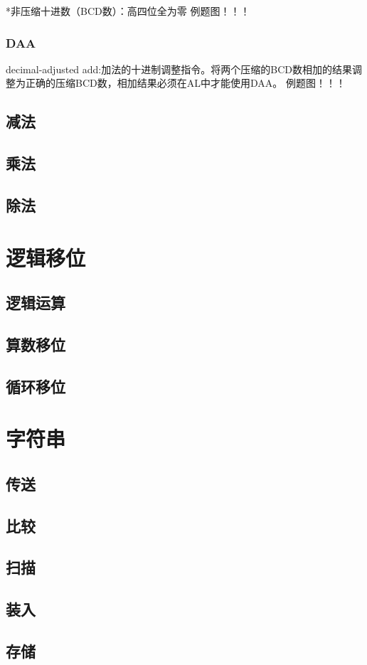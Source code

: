 *非压缩十进数（BCD数）：高四位全为零
例题图！！！
\subsubsection{DAA}
decimal-adjusted add:加法的十进制调整指令。将两个压缩的BCD数相加的结果调整为正确的压缩BCD数，相加结果必须在AL中才能使用DAA。
例题图！！！
\subsection{减法}
\subsection{乘法}
\subsection{除法}
\section{逻辑移位}
\subsection{逻辑运算}
\subsection{算数移位}
\subsection{循环移位}
\section{字符串}
\subsection{传送}
\subsection{比较}
\subsection{扫描}
\subsection{装入}
\subsection{存储}
